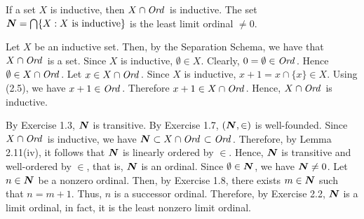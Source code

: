  If a set $X$ is inductive, then $X \cap \textit{Ord\,}$ is inductive. The set 
$\boldsymbol{N} = \bigcap \{ X : X \text{ is inductive} \}$ is the least limit ordinal 
$\neq 0$.
\begin{solution}
Let $X$ be an inductive set. Then, by the Separation Schema, we have that 
$X \cap \textit{Ord\,}$ is a set. Since $X$ is inductive, $\emptyset \in X$. Clearly, 
$0 = \emptyset \in \textit{Ord\,}$. Hence $\emptyset \in X \cap \textit{Ord\,}$. Let 
$x \in X \cap \textit{Ord\,}$. Since $X$ is inductive, $x + 1 = x \cap \{ x \} \in X$. 
Using (2.5), we have $x + 1 \in \textit{Ord\,}$. Therefore $x + 1 \in X \cap \textit{Ord\,}$. 
Hence, $X \cap \textit{Ord\,}$ is inductive. 

By Exercise 1.3, $\boldsymbol{N}$ is transitive. By Exercise 1.7, $(\boldsymbol{N}, \in)$ is 
well-founded. Since $X \cap \textit{Ord\,}$ is inductive, we have 
$\boldsymbol{N} \subset X \cap \textit{Ord\,} \subset \textit{Ord\,}$. Therefore, by Lemma 2.11(iv), it follows
that $\boldsymbol{N}$ is linearly ordered by $\in$. Hence, $\boldsymbol{N}$ is transitive and 
well-ordered by $\in$, that is, $\boldsymbol{N}$ is an ordinal. Since $\emptyset \in \boldsymbol{N}$, 
we have $\boldsymbol{N} \neq 0$. Let $n \in \boldsymbol{N}$ be a nonzero ordinal. Then, by Exercise 
1.8, there exists $m \in \boldsymbol{N}$ such that $n = m + 1$. Thus, $n$ is a successor 
ordinal. Therefore, by Exercise 2.2, $\boldsymbol{N}$ is a limit ordinal, in fact, it is 
the least nonzero limit ordinal.
\end{solution}